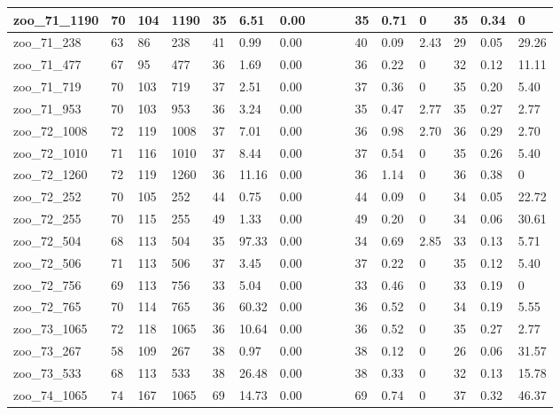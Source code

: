 \begin{landscape}
\begin{longtable}{llllllllllllllll}
zoo\_71\_1190 & 70 & 104 & 1190 & 35 & 6.51 & 0.00 &  &  &  & 35 & 0.71 & 0 & 35 & 0.34 & 0 \\ \hline 
zoo\_71\_238 & 63 & 86 & 238 & 41 & 0.99 & 0.00 &  &  &  & 40 & 0.09 & 2.43 & 29 & 0.05 & 29.26 \\ \hline 
zoo\_71\_477 & 67 & 95 & 477 & 36 & 1.69 & 0.00 &  &  &  & 36 & 0.22 & 0 & 32 & 0.12 & 11.11 \\ \hline 
zoo\_71\_719 & 70 & 103 & 719 & 37 & 2.51 & 0.00 &  &  &  & 37 & 0.36 & 0 & 35 & 0.20 & 5.40 \\ \hline 
zoo\_71\_953 & 70 & 103 & 953 & 36 & 3.24 & 0.00 &  &  &  & 35 & 0.47 & 2.77 & 35 & 0.27 & 2.77 \\ \hline 
zoo\_72\_1008 & 72 & 119 & 1008 & 37 & 7.01 & 0.00 &  &  &  & 36 & 0.98 & 2.70 & 36 & 0.29 & 2.70 \\ \hline 
zoo\_72\_1010 & 71 & 116 & 1010 & 37 & 8.44 & 0.00 &  &  &  & 37 & 0.54 & 0 & 35 & 0.26 & 5.40 \\ \hline 
zoo\_72\_1260 & 72 & 119 & 1260 & 36 & 11.16 & 0.00 &  &  &  & 36 & 1.14 & 0 & 36 & 0.38 & 0 \\ \hline 
zoo\_72\_252 & 70 & 105 & 252 & 44 & 0.75 & 0.00 &  &  &  & 44 & 0.09 & 0 & 34 & 0.05 & 22.72 \\ \hline 
zoo\_72\_255 & 70 & 115 & 255 & 49 & 1.33 & 0.00 &  &  &  & 49 & 0.20 & 0 & 34 & 0.06 & 30.61 \\ \hline 
zoo\_72\_504 & 68 & 113 & 504 & 35 & 97.33 & 0.00 &  &  &  & 34 & 0.69 & 2.85 & 33 & 0.13 & 5.71 \\ \hline 
zoo\_72\_506 & 71 & 113 & 506 & 37 & 3.45 & 0.00 &  &  &  & 37 & 0.22 & 0 & 35 & 0.12 & 5.40 \\ \hline 
zoo\_72\_756 & 69 & 113 & 756 & 33 & 5.04 & 0.00 &  &  &  & 33 & 0.46 & 0 & 33 & 0.19 & 0 \\ \hline 
zoo\_72\_765 & 70 & 114 & 765 & 36 & 60.32 & 0.00 &  &  &  & 36 & 0.52 & 0 & 34 & 0.19 & 5.55 \\ \hline 
zoo\_73\_1065 & 72 & 118 & 1065 & 36 & 10.64 & 0.00 &  &  &  & 36 & 0.52 & 0 & 35 & 0.27 & 2.77 \\ \hline 
zoo\_73\_267 & 58 & 109 & 267 & 38 & 0.97 & 0.00 &  &  &  & 38 & 0.12 & 0 & 26 & 0.06 & 31.57 \\ \hline 
zoo\_73\_533 & 68 & 113 & 533 & 38 & 26.48 & 0.00 &  &  &  & 38 & 0.33 & 0 & 32 & 0.13 & 15.78 \\ \hline 
zoo\_74\_1065 & 74 & 167 & 1065 & 69 & 14.73 & 0.00 &  &  &  & 69 & 0.74 & 0 & 37 & 0.32 & 46.37 \\ \hline 

\end{longtable}
\end{landscape}
